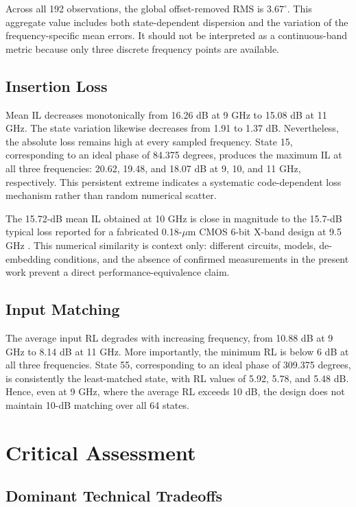 \documentclass[conference]{IEEEtran}
\begin{document}
Across all 192 observations, the global offset-removed RMS is
$3.67^\circ$. This aggregate value includes both state-dependent dispersion
and the variation of the frequency-specific mean errors. It should not be
interpreted as a continuous-band metric because only three discrete frequency
points are available.

\subsection{Insertion Loss}

Mean IL decreases monotonically from 16.26 dB at 9 GHz to 15.08 dB at
11 GHz. The state variation likewise decreases from 1.91 to 1.37 dB.
Nevertheless, the absolute loss remains high at every sampled frequency. State
15, corresponding to an ideal phase of 84.375 degrees, produces the maximum
IL at all three frequencies: 20.62, 19.48, and 18.07 dB at 9, 10, and
11 GHz, respectively. This persistent extreme indicates a systematic
code-dependent loss mechanism rather than random numerical scatter.

The 15.72-dB mean IL obtained at 10 GHz is close in magnitude to the
15.7-dB typical loss reported for a fabricated 0.18-$\mu$m CMOS 6-bit
X-band design at 9.5 GHz \cite{kang2009}. This numerical similarity is
context only: different circuits, models, de-embedding conditions, and the
absence of confirmed measurements in the present work prevent a direct
performance-equivalence claim.

\subsection{Input Matching}

The average input RL degrades with increasing frequency, from 10.88 dB at
9 GHz to 8.14 dB at 11 GHz. More importantly, the minimum RL is below
6 dB at all three frequencies. State 55, corresponding to an ideal phase of
309.375 degrees, is consistently the least-matched state, with RL values of
5.92, 5.78, and 5.48 dB. Hence, even at 9 GHz, where the average RL exceeds
10 dB, the design does not maintain 10-dB matching over all 64 states.

\section{Critical Assessment}

\subsection{Dominant Technical Tradeoffs}
\end{document}
